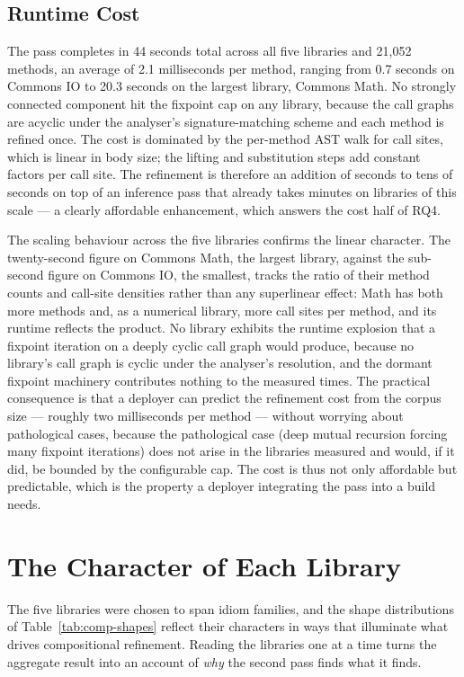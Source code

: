 \subsection{Runtime Cost}

The pass completes in 44 seconds total across all five libraries and 21{,}052
methods, an average of 2.1 milliseconds per method, ranging from 0.7 seconds on
Commons IO to 20.3 seconds on the largest library, Commons Math. No strongly
connected component hit the fixpoint cap on any library, because the call graphs
are acyclic under the analyser's signature-matching scheme and each method is
refined once. The cost is dominated by the per-method AST walk for call sites,
which is linear in body size; the lifting and substitution steps add constant
factors per call site. The refinement is therefore an addition of seconds to
tens of seconds on top of an inference pass that already takes minutes on
libraries of this scale --- a clearly affordable enhancement, which answers the
cost half of RQ4.

The scaling behaviour across the five libraries confirms the linear character. The
twenty-second figure on Commons Math, the largest library, against the sub-second
figure on Commons IO, the smallest, tracks the ratio of their method counts and
call-site densities rather than any superlinear effect: Math has both more methods
and, as a numerical library, more call sites per method, and its runtime reflects
the product. No library exhibits the runtime explosion that a fixpoint iteration on
a deeply cyclic call graph would produce, because no library's call graph is
cyclic under the analyser's resolution, and the dormant fixpoint machinery
contributes nothing to the measured times. The practical consequence is that a
deployer can predict the refinement cost from the corpus size --- roughly two
milliseconds per method --- without worrying about pathological cases, because the
pathological case (deep mutual recursion forcing many fixpoint iterations) does not
arise in the libraries measured and would, if it did, be bounded by the
configurable cap. The cost is thus not only affordable but predictable, which is
the property a deployer integrating the pass into a build needs.

\section{The Character of Each Library}
\label{sec:comp-perlibrary}

The five libraries were chosen to span idiom families, and the shape
distributions of Table~\ref{tab:comp-shapes} reflect their characters in ways
that illuminate what drives compositional refinement. Reading the libraries one
at a time turns the aggregate result into an account of \emph{why} the second
pass finds what it finds.

